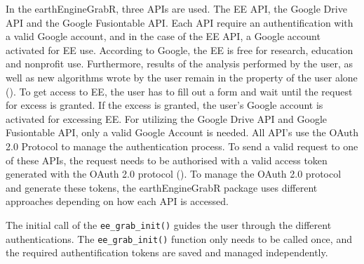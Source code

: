 In the earthEngineGrabR, three APIs are used. The EE API, the Google Drive API and the Google Fusiontable API. Each API require an authentification with a valid Google account, and in the case of the EE API, a Google account activated for EE use. According to Google, the EE is free for research, education and nonprofit use. Furthermore, results of the analysis performed by the user, as well as new algorithms wrote by the user remain in the property of the user alone (\cite{terms}).
To get access to EE, the user has to fill out a form and wait until the request for excess is granted. If the excess is granted, the user's Google account is activated for excessing EE. For utilizing the Google Drive API and Google Fusiontable API, only a valid Google Account is needed. All API's use the OAuth 2.0 Protocol to manage the authentication process. To send a valid request to one of these APIs, the request needs to be authorised with a valid access token generated with the OAuth 2.0 protocol (\cite{hardt2012oauth}). To manage the OAuth 2.0 protocol and generate these tokens, the earthEngineGrabR package uses different approaches depending on how each API is accessed. 

The initial call of the \texttt{ee\_grab\_init()} guides the user through the different authentications. The \texttt{ee\_grab\_init()} function only needs to be called once, and the required authentification tokens are saved and managed independently. 





